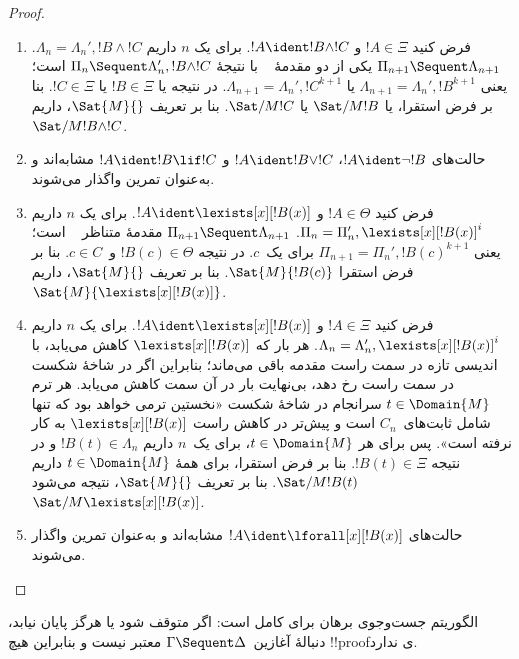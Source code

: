 \documentclass[../../../include/open-logic-section]{subfiles}
\begin{document}
\begin{proof}
\begin{enumerate}
  \item فرض کنید $!A \in \Xi$ و $!A \ident !B \land !C$. برای
  یک $n$ داریم $\Lambda_n = \Lambda_n', !B \land !C$.
  $\Pi_{n+1} \Sequent \Lambda_{n+1}$ یکی از دو مقدمهٔ
  ~\RightR{\land} با نتیجهٔ
  $\Pi_n \Sequent \Lambda'_n, !B \land !C$ است؛ یعنی
  $\Lambda_{n+1} = \Lambda_n', !B^{k+1}$ یا
  $\Lambda_{n+1} = \Lambda_n', !C^{k+1}$. در نتیجه یا
  $!B \in \Xi$ یا $!C \in \Xi$. بنا بر فرض استقرا، یا
  $\Sat/{M}{!B}$ یا $\Sat/{M}{!C}$. بنا بر تعریف $\Sat{M}{}$، داریم
  $\Sat/{M}{!B \land !C}$.

  \item حالت‌های $!A \ident \lnot !B$، $!A \ident !B \lor !C$ و
  $!A \ident !B \lif !C$ مشابه‌اند و به‌عنوان تمرین واگذار می‌شوند.

  \item فرض کنید $!A \in \Theta$ و
  $!A \ident \lexists[x][!B(x)]$. برای یک $n$ داریم
  $\Pi_n = \Pi_n', \lexists[x][!B(x)]^i$.
  $\Pi_{n+1} \Sequent \Lambda_{n+1}$ مقدمهٔ متناظر
  ~\LeftR{\lexists} است؛ یعنی
  $\Pi_{n+1} = \Pi_n', !B(c)^{k+1}$ برای یک~$c$. در نتیجه
  $!B(c) \in \Theta$ و~$c \in C$. بنا بر فرض استقرا
  $\Sat{M}{!B(c)}$. بنا بر تعریف $\Sat{M}{}$، داریم
  $\Sat{M}{\lexists[x][!B(x)]}$.

  \item فرض کنید $!A \in \Xi$ و
  $!A \ident \lexists[x][!B(x)]$. برای یک $n$ داریم
  $\Lambda_n = \Lambda_n', \lexists[x][!B(x)]^i$. هر بار که
  $\lexists[x][!B(x)]$ کاهش می‌یابد، با اندیسی تازه در سمت راست مقدمه
  باقی می‌ماند؛ بنابراین اگر در شاخهٔ شکست در سمت راست رخ دهد،
  بی‌نهایت بار در آن سمت کاهش می‌یابد. هر ترم
  $t \in \Domain{M}$ سرانجام در شاخهٔ شکست «نخستین ترمی خواهد بود که
  تنها شامل ثابت‌های~$C_n$ است و پیش‌تر در کاهش راست
  $\lexists[x][!B(x)]$ به کار نرفته است». پس برای هر
  $t \in \Domain{M}$، برای یک~$n$ داریم $!B(t) \in \Lambda_n$ و در
  نتیجه $!B(t) \in \Xi$. بنا بر فرض استقرا، برای همهٔ
  $t \in \Domain{M}$ داریم $\Sat/{M}{!B(t)}$. بنا بر تعریف
  $\Sat{M}{}$، نتیجه می‌شود
  $\Sat/{M}{\lexists[x][!B(x)]}$.

  \item حالت‌های $!A \ident \lforall[x][!B(x)]$ مشابه‌اند و
  به‌عنوان تمرین واگذار می‌شوند.
\end{enumerate}
\end{proof}

\begin{cor}
الگوریتم جست‌وجوی برهان برای  کامل است: اگر متوقف شود یا
هرگز پایان نیابد، دنبالهٔ آغازین~$\Gamma \Sequent \Delta$ معتبر نیست
و بنابراین هیچ !!{proof}ی ندارد.
\end{cor}
\end{document}
